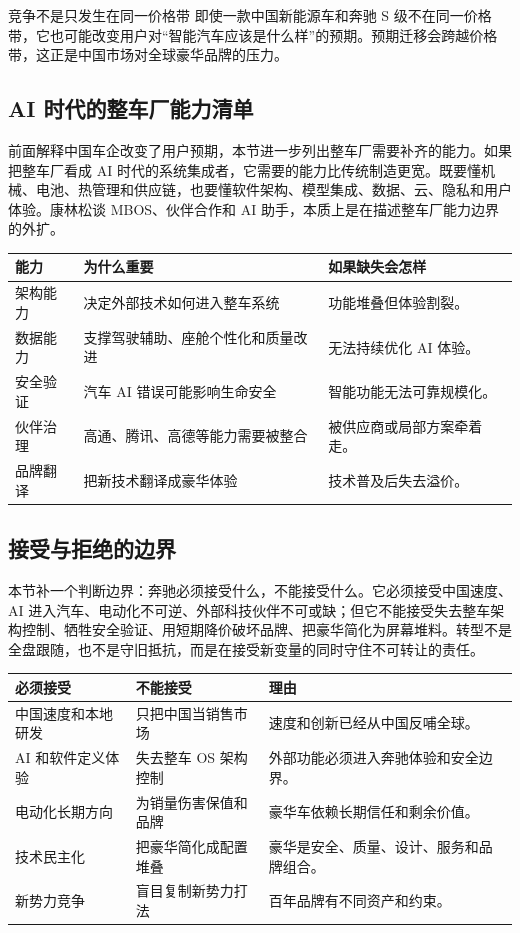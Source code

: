 \begin{warningbox}{竞争不是只发生在同一价格带}
即使一款中国新能源车和奔驰 S 级不在同一价格带，它也可能改变用户对“智能汽车应该是什么样”的预期。预期迁移会跨越价格带，这正是中国市场对全球豪华品牌的压力。
\end{warningbox}

\subsection{AI 时代的整车厂能力清单}

前面解释中国车企改变了用户预期，本节进一步列出整车厂需要补齐的能力。如果把整车厂看成 AI 时代的系统集成者，它需要的能力比传统制造更宽。既要懂机械、电池、热管理和供应链，也要懂软件架构、模型集成、数据、云、隐私和用户体验。康林松谈 MBOS、伙伴合作和 AI 助手，本质上是在描述整车厂能力边界的外扩。

\noindent\begin{tabularx}{\textwidth}{p{}p{}X}
\toprule
能力 & 为什么重要 & 如果缺失会怎样 \\
\midrule
架构能力 & 决定外部技术如何进入整车系统 & 功能堆叠但体验割裂。 \\
数据能力 & 支撑驾驶辅助、座舱个性化和质量改进 & 无法持续优化 AI 体验。 \\
安全验证 & 汽车 AI 错误可能影响生命安全 & 智能功能无法可靠规模化。 \\
伙伴治理 & 高通、腾讯、高德等能力需要被整合 & 被供应商或局部方案牵着走。 \\
品牌翻译 & 把新技术翻译成豪华体验 & 技术普及后失去溢价。 \\
\bottomrule
\end{tabularx}

\subsection{接受与拒绝的边界}

本节补一个判断边界：奔驰必须接受什么，不能接受什么。它必须接受中国速度、AI 进入汽车、电动化不可逆、外部科技伙伴不可或缺；但它不能接受失去整车架构控制、牺牲安全验证、用短期降价破坏品牌、把豪华简化为屏幕堆料。转型不是全盘跟随，也不是守旧抵抗，而是在接受新变量的同时守住不可转让的责任。

\noindent\begin{tabularx}{\textwidth}{p{}p{}X}
\toprule
必须接受 & 不能接受 & 理由 \\
\midrule
中国速度和本地研发 & 只把中国当销售市场 & 速度和创新已经从中国反哺全球。 \\
AI 和软件定义体验 & 失去整车 OS 架构控制 & 外部功能必须进入奔驰体验和安全边界。 \\
电动化长期方向 & 为销量伤害保值和品牌 & 豪华车依赖长期信任和剩余价值。 \\
技术民主化 & 把豪华简化成配置堆叠 & 豪华是安全、质量、设计、服务和品牌组合。 \\
新势力竞争 & 盲目复制新势力打法 & 百年品牌有不同资产和约束。 \\
\bottomrule
\end{tabularx}

